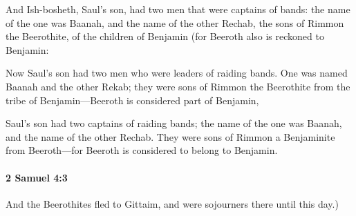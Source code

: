 			\begin{versebox}
					\item[BHS] 
					\item[ASV] And Ish-bosheth, Saul's son, had two men that were captains of bands: the name of the one was Baanah, and the name of the other Rechab, the sons of Rimmon the Beerothite, of the children of Benjamin (for Beeroth also is reckoned to Benjamin:
					\item[NIV] Now Saul’s son had two men who were leaders of raiding bands. One was named Baanah and the other Rekab; they were sons of Rimmon the Beerothite from the tribe of Benjamin—Beeroth is considered part of Benjamin,
					\item[NRSV] Saul’s son had two captains of raiding bands; the name of the one was Baanah, and the name of the other Rechab. They were sons of Rimmon a Benjaminite from Beeroth—for Beeroth is considered to belong to Benjamin.
			\end{versebox}

		\paragraph{2 Samuel 4:3} %
			\label{2SAMUEL-4-3}

			And the Beerothites fled to Gittaim, and were sojourners there until this day.)

